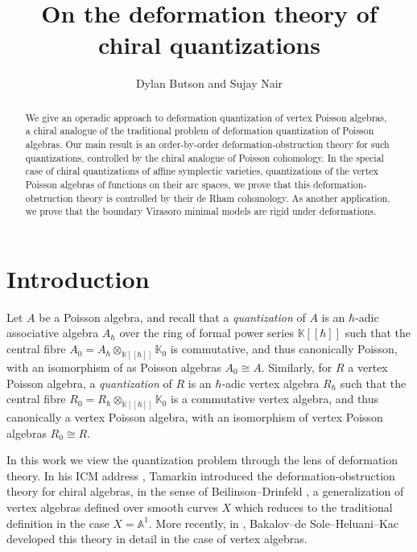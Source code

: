 \documentclass[11pt]{amsart}
\title{On the deformation theory of chiral quantizations}
\author{Dylan Butson and Sujay Nair}
\date{}
\numberwithin{equation}{section}
\theoremstyle{definition}
\newcommand{\bb}{\mathbb}
\newcommand{\fph}{{[\![\hbar]\!]}}
\newcommand{\ik}{{\bb K}}
\newcommand{\0}{{\textbf{0}}}
\begin{document}
 

\begin{abstract}
	We give an operadic approach to deformation quantization of vertex Poisson algebras, a chiral analogue of the traditional problem of deformation quantization of Poisson algebras.
	Our main result is an order-by-order deformation-obstruction theory for such quantizations, controlled by the chiral analogue of Poisson cohomology. In the special case of chiral quantizations of affine symplectic varieties, quantizations of the vertex Poisson algebras of functions on their arc spaces, we prove that this deformation-obstruction theory is controlled by their de Rham cohomology. As another application, we prove that the boundary Virasoro minimal models are rigid under deformations.
\end{abstract}
\maketitle



\begingroup
\hypersetup{hidelinks}
\tableofcontents
\endgroup





\section{Introduction}

Let $A$ be a Poisson algebra, and recall that a \emph{quantization} of $A$ is an $\hbar$-adic associative algebra $A_\hbar$ over the ring of formal power series $\ik\fph$ such that the central fibre $A_0=A_\hbar\otimes_{\ik\fph}\ik_0$ is commutative, and thus canonically Poisson, with an isomorphism of as Poisson algebras $A_0\cong A$. Similarly, for $R$ a vertex Poisson algebra, a \emph{quantization} of $R$ is an $\hbar$-adic vertex algebra $R_\hbar$ such that the central fibre $R_0 = R_\hbar\otimes_{\ik\fph}\ik_0$ is a commutative vertex algebra, and thus canonically a vertex Poisson algebra, with an isomorphism of vertex Poisson algebras $R_0\cong R$.

In this work we view the quantization problem through the lens of deformation theory. In his ICM address \cite{Tamarkin03}, Tamarkin introduced the deformation-obstruction theory for chiral algebras, in the sense of Beilinson--Drinfeld \cite{BD1}, a generalization of vertex algebras defined over smooth curves $X$ which reduces to the traditional definition in the case $X=\bb A^1$. More recently, in \cite{BDSHK19}, Bakalov--de Sole--Heluani--Kac developed this theory in detail in the case of vertex algebras.
\end{document}
